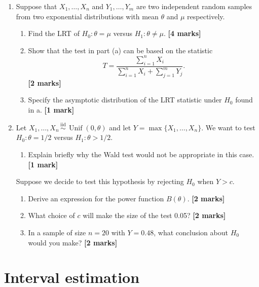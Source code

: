 \documentclass[
]{book}
\providecommand{\tightlist}{%
  \setlength{\itemsep}{0pt}\setlength{\parskip}{0pt}}
\DeclareMathOperator{\Unif}{Unif}
\newcommand{\iid}{\,\overset{\text{iid}}{\sim}\,}
\theoremstyle{definition}
\theoremstyle{definition}
\theoremstyle{definition}
\theoremstyle{definition}
\theoremstyle{remark}
\begin{document}
\begin{enumerate}
\def\labelenumi{\arabic{enumi}.}
\item
  Suppose that \(X_1,\dots,X_n\) and \(Y_1,\dots,Y_m\) are two independent random samples from two exponential distributions with mean \(\theta\) and \(\mu\) respectively.

  \begin{enumerate}
  \def\labelenumii{(\alph{enumii})}
  \item
    Find the LRT of \(H_0:\theta = \mu\) versus \(H_1:\theta\neq\mu\). \textbf{{[}4 marks{]}}
  \item
    Show that the test in part (a) can be based on the statistic
    \[
     T = \frac{\sum_{i=1}^n X_i}{\sum_{i=1}^n X_i + \sum_{j=1}^m Y_j}.
     \]
    \textbf{{[}2 marks{]}}
  \item
    Specify the asymptotic distribution of the LRT statistic under \(H_0\) found in a. \textbf{{[}1 mark{]}}
  \end{enumerate}
\item
  Let \(X_1,\dots,X_n\iid\Unif(0,\theta)\) and let \(Y=\max\{X_1,\dots,X_n\}\). We want to test \(H_0:\theta = 1/2\) versus \(H_1:\theta > 1/2\).

  \begin{enumerate}
  \def\labelenumii{(\alph{enumii})}
  \tightlist
  \item
    Explain briefly why the Wald test would not be appropriate in this case. \textbf{{[}1 mark{]}}
  \end{enumerate}

  Suppose we decide to test this hypothesis by rejecting \(H_0\) when \(Y > c\).

  \begin{enumerate}
  \def\labelenumii{(\alph{enumii})}
  \setcounter{enumii}{1}
  \item
    Derive an expression for the power function \(B(\theta)\). \textbf{{[}2 marks{]}}
  \item
    What choice of \(c\) will make the size of the test 0.05? \textbf{{[}2 marks{]}}
  \item
    In a sample of size \(n=20\) with \(Y=0.48\), what conclusion about \(H_0\) would you make? \textbf{{[}2 marks{]}}
  \end{enumerate}
\end{enumerate}

\hypertarget{interval-estimation}{%
\chapter{Interval estimation}\label{interval-estimation}}
\end{document}
